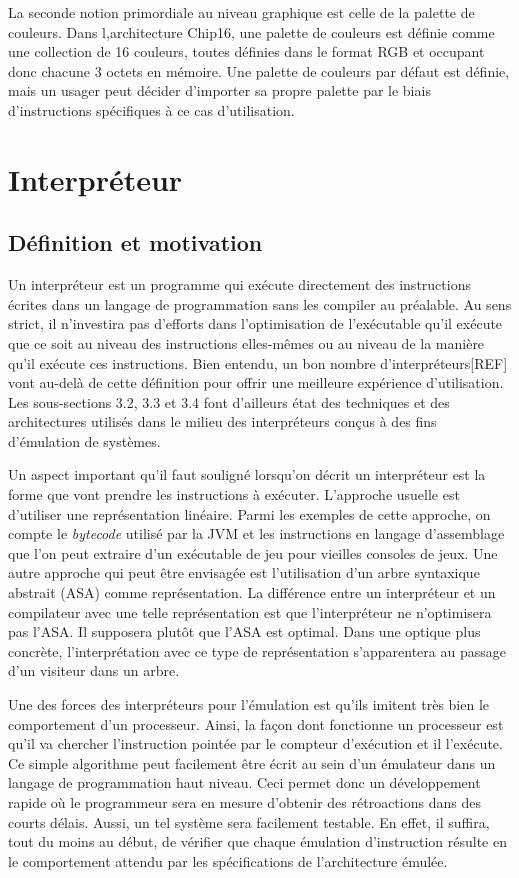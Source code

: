 \documentclass{article} %
\begin{document}
La seconde notion primordiale au niveau graphique est celle de la palette de couleurs. Dans l,architecture Chip16, une palette de couleurs est définie comme une collection de 16 couleurs, toutes définies dans le format RGB et occupant donc chacune 3 octets en mémoire. Une palette de couleurs par défaut est définie, mais un usager peut décider d'importer sa propre palette par le biais d'instructions spécifiques à ce cas d'utilisation.

\section{Interpréteur}
\subsection{Définition et motivation}
Un interpréteur est un programme qui exécute directement des instructions écrites dans un langage de programmation sans les compiler au préalable. Au sens strict, il n'investira pas d'efforts dans l'optimisation de l'exécutable qu'il exécute que ce soit au niveau des instructions elles-mêmes ou au niveau de la manière qu'il exécute ces instructions. Bien entendu, un bon nombre d'interpréteurs[REF] vont au-delà de cette définition  pour offrir une meilleure expérience d'utilisation. Les sous-sections 
3.2, 3.3 et 3.4 font d'ailleurs état des techniques et des architectures utilisés dans le milieu des interpréteurs conçus à des fins d'émulation de systèmes.

Un aspect important qu'il faut souligné lorsqu'on décrit un interpréteur est la forme que vont prendre les instructions à exécuter. L'approche usuelle est d'utiliser une représentation linéaire. Parmi les exemples de cette approche, on compte le \textit{bytecode} utilisé par la JVM et les instructions en langage d'assemblage que l'on peut extraire d'un exécutable de jeu pour vieilles consoles de jeux. Une autre approche qui peut être envisagée est l'utilisation d'un arbre syntaxique abstrait (ASA) comme représentation. La différence entre un interpréteur et un compilateur avec une telle représentation est que l'interpréteur ne n'optimisera pas l'ASA. Il supposera plutôt que l'ASA est optimal. Dans une optique plus concrète, l'interprétation avec ce type de représentation s'apparentera au passage d'un visiteur dans un arbre.

Une des forces des interpréteurs pour l'émulation est qu'ils imitent très bien le comportement d'un processeur. Ainsi, la façon dont fonctionne un processeur est qu'il va chercher l'instruction pointée par le compteur d'exécution et il l'exécute. Ce simple algorithme peut facilement être écrit au sein d'un émulateur dans un langage de programmation haut niveau. Ceci permet donc un développement rapide où le programmeur sera en mesure d'obtenir des rétroactions dans des courts délais. Aussi, un tel système sera facilement testable. En effet, il suffira, tout du moins au début, de vérifier que chaque émulation d'instruction résulte en le comportement attendu par les spécifications de l'architecture émulée.
\end{document}
